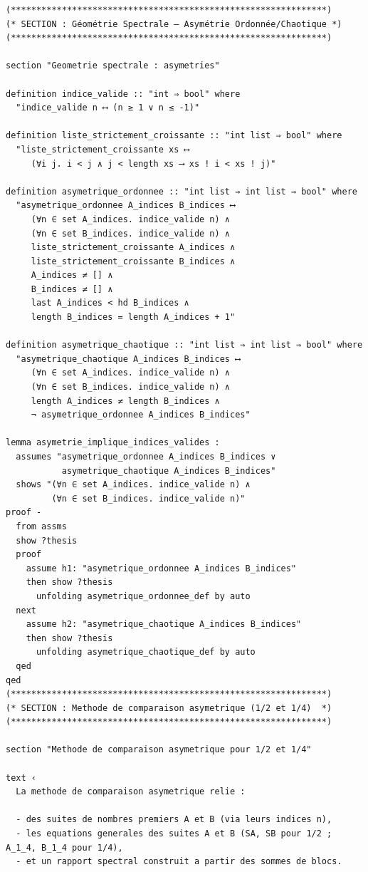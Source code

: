 \documentclass[a4paper,11pt]{article}
\begin{document}
\begin{holcode}[title={\textcolor{white}{File: methode\_spectral.thy -- Part 1/4}}]
\begin{lstlisting}
(**************************************************************)
(* SECTION : Géométrie Spectrale — Asymétrie Ordonnée/Chaotique *)
(**************************************************************)

section "Geometrie spectrale : asymetries"

definition indice_valide :: "int ⇒ bool" where
  "indice_valide n ⟷ (n ≥ 1 ∨ n ≤ -1)"

definition liste_strictement_croissante :: "int list ⇒ bool" where
  "liste_strictement_croissante xs ⟷
     (∀i j. i < j ∧ j < length xs ⟶ xs ! i < xs ! j)"

definition asymetrique_ordonnee :: "int list ⇒ int list ⇒ bool" where
  "asymetrique_ordonnee A_indices B_indices ⟷
     (∀n ∈ set A_indices. indice_valide n) ∧
     (∀n ∈ set B_indices. indice_valide n) ∧
     liste_strictement_croissante A_indices ∧
     liste_strictement_croissante B_indices ∧
     A_indices ≠ [] ∧
     B_indices ≠ [] ∧
     last A_indices < hd B_indices ∧
     length B_indices = length A_indices + 1"

definition asymetrique_chaotique :: "int list ⇒ int list ⇒ bool" where
  "asymetrique_chaotique A_indices B_indices ⟷
     (∀n ∈ set A_indices. indice_valide n) ∧
     (∀n ∈ set B_indices. indice_valide n) ∧
     length A_indices ≠ length B_indices ∧
     ¬ asymetrique_ordonnee A_indices B_indices"

lemma asymetrie_implique_indices_valides :
  assumes "asymetrique_ordonnee A_indices B_indices ∨
           asymetrique_chaotique A_indices B_indices"
  shows "(∀n ∈ set A_indices. indice_valide n) ∧
         (∀n ∈ set B_indices. indice_valide n)"
proof -
  from assms
  show ?thesis
  proof
    assume h1: "asymetrique_ordonnee A_indices B_indices"
    then show ?thesis
      unfolding asymetrique_ordonnee_def by auto
  next
    assume h2: "asymetrique_chaotique A_indices B_indices"
    then show ?thesis
      unfolding asymetrique_chaotique_def by auto
  qed
qed
(**************************************************************)
(* SECTION : Methode de comparaison asymetrique (1/2 et 1/4)  *)
(**************************************************************)

section "Methode de comparaison asymetrique pour 1/2 et 1/4"

text ‹
  La methode de comparaison asymetrique relie :

  - des suites de nombres premiers A et B (via leurs indices n),
  - les equations generales des suites A et B (SA, SB pour 1/2 ; A_1_4, B_1_4 pour 1/4),
  - et un rapport spectral construit a partir des sommes de blocs.


\end{lstlisting}
\end{holcode}
\end{document}
